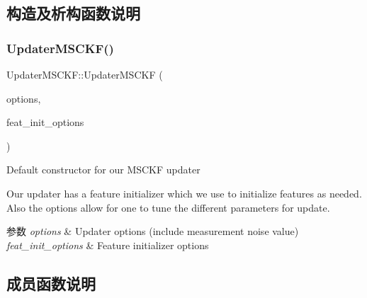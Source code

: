 \subsection{构造及析构函数说明}
\mbox{\label{classov__msckf_1_1UpdaterMSCKF_af8d2ffc21b0209319c7fd9a351b9d3ad}} 
\subsubsection{\texorpdfstring{Updater\+M\+S\+C\+K\+F()}{UpdaterMSCKF()}}
{\footnotesize\ttfamily Updater\+M\+S\+C\+K\+F\+::\+Updater\+M\+S\+C\+KF (\begin{DoxyParamCaption}\item[{\hyperlink{structov__msckf_1_1UpdaterOptions}{Updater\+Options} \&}]{options,  }\item[{\hyperlink{structov__core_1_1FeatureInitializerOptions}{ov\+\_\+core\+::\+Feature\+Initializer\+Options} \&}]{feat\+\_\+init\+\_\+options }\end{DoxyParamCaption})}



Default constructor for our M\+S\+C\+KF updater 

Our updater has a feature initializer which we use to initialize features as needed. Also the options allow for one to tune the different parameters for update.


\begin{DoxyParams}{参数}
{\em options} & Updater options (include measurement noise value) \\
\hline
{\em feat\+\_\+init\+\_\+options} & Feature initializer options \\
\hline
\end{DoxyParams}


\subsection{成员函数说明}
\mbox{\label{classov__msckf_1_1UpdaterMSCKF_a4f307c56582c5fefeef298c5b54da2fd}} 

